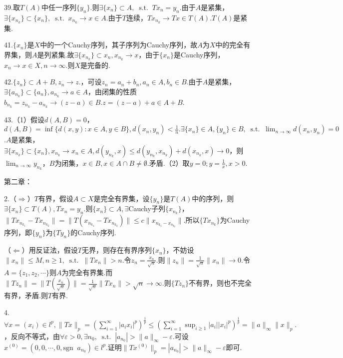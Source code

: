 \documentclass[bwprint, withoutpreface]{cumcmthesis}
\newcommand*{\st}{\mathop{}\!\mathrm{s.t.}\!\mathop{}}
\newcommand*{\norm}[1]{\| #1 \|}
\newcommand*{\nnorm}[2]{\| #1 \|_{#2}}
\newcommand*{\sgn}[1]{\mathrm{sgn}\!\mathop{}#1}
\begin{document}
39.取$T(A)$中任一序列$\{y_n\}$.则$\exists \{x_n\} \subset A, \st Tx_n = y_n$.由于$A$是紧集，$\exists \{x_{n_k}\} \subset \{x_n\}, \st x_{n_k} \to x \in A$.由于$T$连续，$Tx_{n_k} \to Tx \in T(A)$.$T(A)$是紧集.

41.$\{x_n\}$是$X$中的一个Cauchy序列，其子序列为Cauchy序列，故$A$为$X$中的完全有界集，则$A$是列紧集.故$\exists \{x_{n_k}\} \subset {x_n}, x_{n_k} \to x$，由于$\{x_n\}$是Cauchy序列，$x_n \to x \in X, n \to \infty.$则$X$是完备的.

42.$\{z_n\} \subset A + B, z_n \to z.$，可设$z_n = a_n + b_n, a_n \in A, b_n \in B$.由于$A$是紧集，$\exists \{a_{n_k}\} \subset \{a_n\}, a_{n_k} \to a \in A$，由闭集的性质$b_{n_k} = z_{n_k} - a_{n_k} \to (z - a) \in B. z = (z - a) + a \in A + B$.

43.（1）假设$d(A, B) = 0$，$d(A, B) = \inf\{d(x, y): x \in A, y \in B\}, d(x_n, y_n) < \frac{1}{n}. \exists \{x_n\} \in A, \{y_n\} \in B, \st \lim_{n \to \infty}{d(x_n, y_n)} = 0$.$A$是紧集，$\exists \{x_{n_k}\} \subset \{x_n\}, x_{n_k} \to x_n \in A, d(y_{n_k}, x) \leqslant d(y_{n_k}, x_{n_k}) + d(x_{n_k}, x) \to 0$，则$\lim_{n \to \infty}{y_{n_k}}$，$B$为闭集，$x \in B, x \in A \cap B \neq \emptyset$.矛盾.（2）取$y = 0; y = \frac{1}{x}, x > 0.$

\noindent 第二章：

2.（$\Rightarrow$）$T$有界，假设$A \subset X$是完全有界集，设$\{y_n\}$是$T(A)$中的序列，则$\exists \{x_n\} \subset T(A), Tx_n = y_n$.则$\{x_n\} \subset A, \exists$Cauchy子列$\{x_{n_k}\}$，$\norm{Tx_{n_{k_1}} - Tx_{n_{k_2}}} = \norm{T(x_{n_{k_1}} - Tx_{n_{k_2}})} \leqslant c \norm{x_{n_{k_1} - x_{n_{k_2}}}}$.所以$\{Tx_{n_k}\}$为Cauchy序列，即$\{y_n\}$为$\{Ty_n\}$的Cauchy序列.

（$\Leftarrow$）用反证法，假设$T$无界，则存在有界序列$\{x_n\}$，不妨设$\norm{x_n} \leqslant M, n \geqslant 1, \st \norm{Tx_n} > n.$令$z_n = \frac{x_n}{\sqrt{n}}$.则$\norm{z_n} = \frac{1}{\sqrt{n}}\norm{x_n} \to 0$.令$A = \{z_1, z_2, \cdots\}$则$A$为完全有界集.而$\norm{Tz_n} = \norm{T(\frac{x_n}{\sqrt{n}})} = \frac{1}{\sqrt{n}} \norm{Tx_n} > \sqrt{n} \to \infty$.则$\{Tz_n\}$不有界，则也不完全有界，矛盾.则$T$有界.

4.$\forall x = (x_i) \in l^p, \nnorm{Tx}{p} = (\sum_{i = 1}^{\infty}{|a_i x_i|^p})^{\frac{1}{p}} \leqslant (\sum_{i = 1}^{\infty}{\sup_{i \geqslant 1}{|a_i|} |x_i|^p})^{\frac{1}{p}} = \nnorm{a}{\infty} \nnorm{x}{p}.$，反向不等式，由$\forall \varepsilon > 0, \exists n_0, \st |a_{n_0}| > \nnorm{a}{\infty} - \varepsilon.$可设$x^{(0)} = (0, 0, \cdots, 0, \sgn{a_{n_0}}) \in l^p$.证明$\nnorm{Tx^{(0)}}{p} = |a_{n_0}| > \nnorm{a}{\infty} - \varepsilon$即可.
\end{document}
